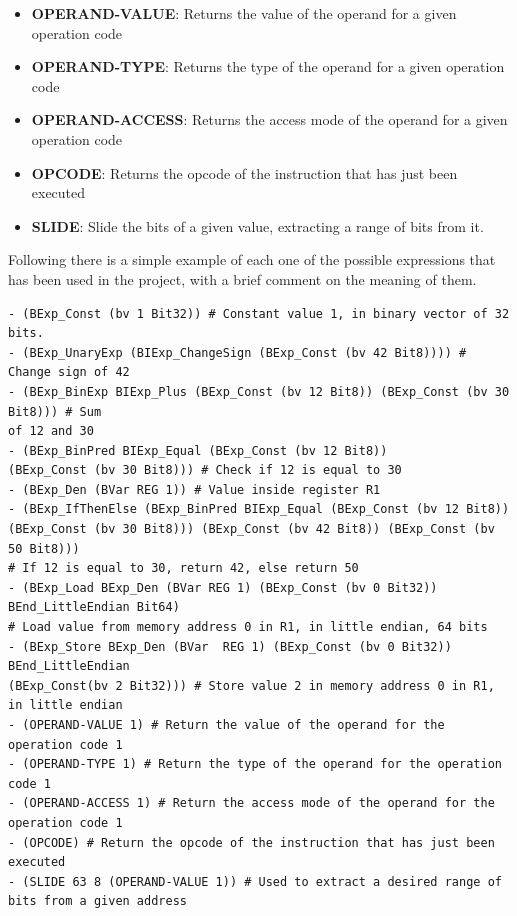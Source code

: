 \begin{itemize}
  \item \textbf{OPERAND-VALUE}: Returns the value of the operand for a given operation
    code

  \item \textbf{OPERAND-TYPE}: Returns the type of the operand for a given operation
    code

  \item \textbf{OPERAND-ACCESS}: Returns the access mode of the operand for a given
    operation code

  \item \textbf{OPCODE}: Returns the opcode of the instruction that has just been
    executed

  \item \textbf{SLIDE}: Slide the bits of a given value, extracting a range of
    bits from it.
\end{itemize}

Following there is a simple example of each one of the possible expressions that
has been used in the project, with a brief comment on the meaning of them.
\begin{verbatim}
- (BExp_Const (bv 1 Bit32)) # Constant value 1, in binary vector of 32 bits.
- (BExp_UnaryExp (BIExp_ChangeSign (BExp_Const (bv 42 Bit8)))) # Change sign of 42
- (BExp_BinExp BIExp_Plus (BExp_Const (bv 12 Bit8)) (BExp_Const (bv 30 Bit8))) # Sum
of 12 and 30
- (BExp_BinPred BIExp_Equal (BExp_Const (bv 12 Bit8)) 
(BExp_Const (bv 30 Bit8))) # Check if 12 is equal to 30
- (BExp_Den (BVar REG 1)) # Value inside register R1
- (BExp_IfThenElse (BExp_BinPred BIExp_Equal (BExp_Const (bv 12 Bit8)) 
(BExp_Const (bv 30 Bit8))) (BExp_Const (bv 42 Bit8)) (BExp_Const (bv 50 Bit8))) 
# If 12 is equal to 30, return 42, else return 50
- (BExp_Load BExp_Den (BVar REG 1) (BExp_Const (bv 0 Bit32)) BEnd_LittleEndian Bit64) 
# Load value from memory address 0 in R1, in little endian, 64 bits
- (BExp_Store BExp_Den (BVar  REG 1) (BExp_Const (bv 0 Bit32)) BEnd_LittleEndian 
(BExp_Const(bv 2 Bit32))) # Store value 2 in memory address 0 in R1, in little endian
- (OPERAND-VALUE 1) # Return the value of the operand for the operation code 1
- (OPERAND-TYPE 1) # Return the type of the operand for the operation code 1
- (OPERAND-ACCESS 1) # Return the access mode of the operand for the operation code 1
- (OPCODE) # Return the opcode of the instruction that has just been executed
- (SLIDE 63 8 (OPERAND-VALUE 1)) # Used to extract a desired range of bits from a given address
\end{verbatim}

